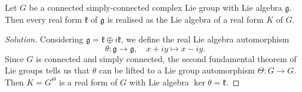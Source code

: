 \documentclass{report}
\begin{document}
\begin{exercise}[Exercise 3.15]
    Let $G$ be a connected simply-connected complex Lie group with Lie algebra $\mathfrak g$.
    Then every real form $\mathfrak k$ of $\mathfrak g$ is realised as the Lie algebra of a real form $K$ of $G$.
\end{exercise}
\begin{proof}[Solution]
    Considering $\mathfrak g = \mathfrak k \oplus i \mathfrak k$, we define the real Lie algebra automorphism
    \[
    \theta: \mathfrak g \to \mathfrak g, \quad x + iy \mapsto x - iy.
    \]
    Since $G$ is connected and simply connected, the second fundamental theorem of Lie groups tells us that $\theta$ can be lifted to a Lie group automorphism $\Theta: G \to G$.
    Then $K = G^\Theta$ is a real form of $G$ with Lie algebra $\ker \theta = \mathfrak k$.
\end{proof}
\end{document}
